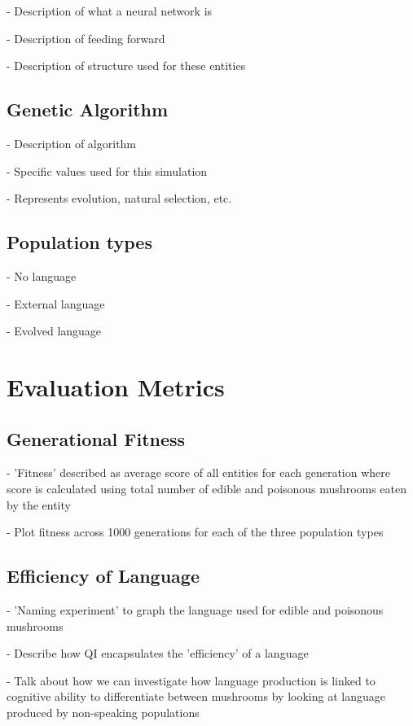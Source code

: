 \documentclass[12pt,a4paper,twoside,openright]{report}
\begin{document}
- Description of what a neural network is

- Description of feeding forward

- Description of structure used for these entities

\subsection{Genetic Algorithm}

- Description of algorithm

- Specific values used for this simulation

- Represents evolution, natural selection, etc.

\subsection{Population types}

- No language

- External language

- Evolved language

\section{Evaluation Metrics}

\subsection{Generational Fitness}

- 'Fitness' described as average score of all entities for each generation where score is calculated using total number of edible and poisonous mushrooms eaten by the entity

- Plot fitness across 1000 generations for each of the three population types

\subsection{Efficiency of Language}

- 'Naming experiment' to graph the language used for edible and poisonous mushrooms

- Describe how QI encapsulates the 'efficiency' of a language

- Talk about how we can investigate how language production is linked to cognitive ability to differentiate between mushrooms by looking at language produced by non-speaking populations
\end{document}
